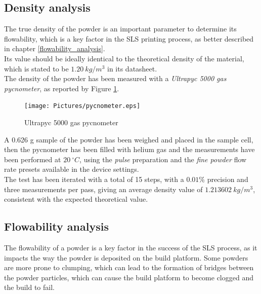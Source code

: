 \documentclass[a4paper]{article}
\begin{document}
        \clearpage

        \subsection{Density analysis\label{density_measurement}}

        The true density of the powder is an important parameter to determine its flowability, which is a key factor in the
        SLS printing process, as better described in chapter \ref{flowability_analysis}. \\
        
        Its value should be ideally identical to the theoretical density of the material, which is stated to be 
        $1.20 \ kg/m^3$ in its datasheet. \\ 
        
        The density of the powder has been measured with a \textit{Ultrapyc 5000 gas
        pycnometer}, as reported by Figure \ref{fig:ultrapyc5000}. \\ 
    
        \begin{figure}[ht]
            \centering
            \texttt{[image: Pictures/pycnometer.eps]}
            \caption{Ultrapyc 5000 gas pycnometer}
            \label{fig:ultrapyc5000}
        \end{figure}
    
        A 0.626 g sample of the powder has been weighed and placed in the sample cell, then the pycnometer has been filled with 
        helium gas and the measurements have been performed at $20 \ ^{\circ}C$, using the \textit{pulse} preparation and the 
        \textit{fine powder} flow rate presets available in the device settings. \\ 
    
        The test has been iterated with a total of 15 steps, with a $0.01 \%$ precision and three measurements per pass, giving an average 
        density value of $1.213602 \ kg/m^3$, consistent with the expected theoretical value. \\ 
    
        \clearpage

        \subsection{Flowability analysis\label{flowability_analysis}}

        The flowability of a powder is a key factor in the success of the SLS process, as it impacts the way the powder is deposited
        on the build platform. Some powders are more prone to clumping, which can lead to the formation of bridges between the powder 
        particles, which can cause the build platform to become clogged and the build to fail. \\ 
\end{document}
